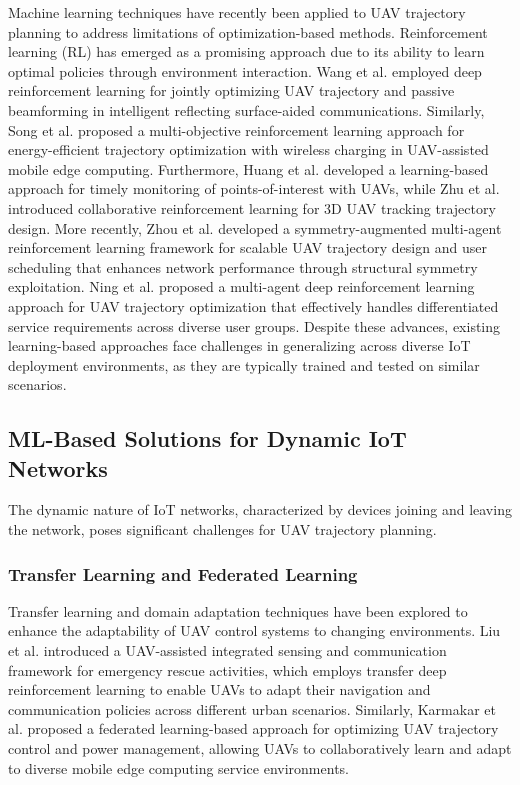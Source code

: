 \documentclass[10pt,conference,letterpaper]{IEEEtran}
\begin{document}
Machine learning techniques have recently been applied to UAV trajectory planning to address limitations of optimization-based methods. Reinforcement learning (RL) has emerged as a promising approach due to its ability to learn optimal policies through environment interaction. Wang et al. \cite{DBLP:journals/tmc/WangWPA23} employed deep reinforcement learning for jointly optimizing UAV trajectory and passive beamforming in intelligent reflecting surface-aided communications. Similarly, Song et al. \cite{DBLP:journals/tmc/SongDXLYX24} proposed a multi-objective reinforcement learning approach for energy-efficient trajectory optimization with wireless charging in UAV-assisted mobile edge computing. Furthermore, Huang et al. \cite{DBLP:journals/tmc/HuangWWYFSWL25} developed a learning-based approach for timely monitoring of points-of-interest with UAVs, while Zhu et al. \cite{DBLP:journals/tmc/ZhuCWHLY24} introduced collaborative reinforcement learning for 3D UAV tracking trajectory design. More recently, Zhou et al. \cite{DBLP:journals/tmc/ZhouXZYW24} developed a symmetry-augmented multi-agent reinforcement learning framework for scalable UAV trajectory design and user scheduling that enhances network performance through structural symmetry exploitation. Ning et al. \cite{DBLP:journals/tmc/NingYWSGJ24} proposed a multi-agent deep reinforcement learning approach for UAV trajectory optimization that effectively handles differentiated service requirements across diverse user groups. Despite these advances, existing learning-based approaches face challenges in generalizing across diverse IoT deployment environments, as they are typically trained and tested on similar scenarios.


\subsection{ML-Based Solutions for Dynamic IoT Networks}

The dynamic nature of IoT networks, characterized by devices joining and leaving the network, poses significant challenges for UAV trajectory planning.

\subsubsection{Transfer Learning and Federated Learning}
Transfer learning and domain adaptation techniques have been explored to enhance the adaptability of UAV control systems to changing environments. Liu et al. \cite{DBLP:conf/mobicom/0001M0HJ024} introduced a UAV-assisted integrated sensing and communication framework for emergency rescue activities, which employs transfer deep reinforcement learning to enable UAVs to adapt their navigation and communication policies across different urban scenarios. Similarly, Karmakar et al. \cite{DBLP:journals/tmc/KarmakarKA24a} proposed a federated learning-based approach for optimizing UAV trajectory control and power management, allowing UAVs to collaboratively learn and adapt to diverse mobile edge computing service environments.
\end{document}
